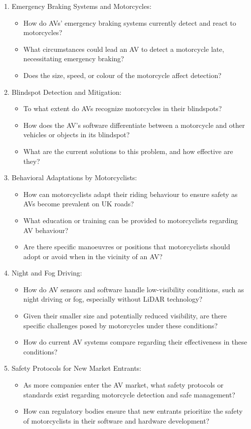 \documentclass[conference]{IEEEtran}
\begin{document}
	\begin{enumerate}
		\item Emergency Braking Systems and Motorcycles:
		\begin{itemize}
			\item How do AVs' emergency braking systems currently detect and react to motorcycles?
			\item What circumstances could lead an AV to detect a motorcycle late, necessitating emergency braking?
			\item Does the size, speed, or colour of the motorcycle affect detection?
		\end{itemize}
		\item Blindspot Detection and Mitigation:
		\begin{itemize}
			\item To what extent do AVs recognize motorcycles in their blindspots?
			\item How does the AV's software differentiate between a motorcycle and other vehicles or objects in its blindspot?
			\item What are the current solutions to this problem, and how effective are they?
		\end{itemize}
		\item Behavioral Adaptations by Motorcyclists:
		\begin{itemize}
			\item How can motorcyclists adapt their riding behaviour to ensure safety as AVs become prevalent on UK roads?
			\item What education or training can be provided to motorcyclists regarding AV behaviour?
			\item Are there specific manoeuvres or positions that motorcyclists should adopt or avoid when in the vicinity of an AV?
		\end{itemize}
		\item Night and Fog Driving:
		\begin{itemize}
			\item How do AV sensors and software handle low-visibility conditions, such as night driving or fog, especially without LiDAR technology?
			\item Given their smaller size and potentially reduced visibility, are there specific challenges posed by motorcycles under these conditions?
			\item How do current AV systems compare regarding their effectiveness in these conditions?
		\end{itemize}

		\item Safety Protocols for New Market Entrants:
		\begin{itemize}
			\item As more companies enter the AV market, what safety protocols or standards exist regarding motorcycle detection and safe management?
			\item How can regulatory bodies ensure that new entrants prioritize the safety of motorcyclists in their software and hardware development?
		\end{itemize}
	\end{enumerate}
\end{document}

